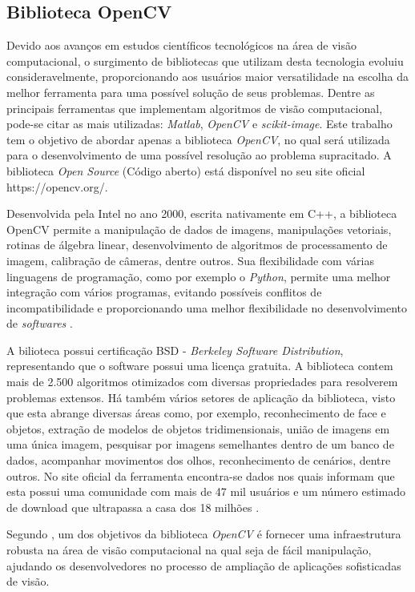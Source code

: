 \subsection{\textbf{Biblioteca OpenCV}}

Devido aos avanços em estudos científicos tecnológicos na área de visão computacional, o surgimento de bibliotecas que utilizam desta tecnologia evoluiu consideravelmente, proporcionando aos usuários maior versatilidade na escolha da melhor ferramenta para uma possível solução de seus problemas. Dentre as principais ferramentas que implementam algoritmos de visão computacional, pode-se citar as mais utilizadas: \textit{Matlab}, \textit{OpenCV} e \textit{scikit-image}. Este trabalho tem o objetivo de abordar apenas a biblioteca \textit{OpenCV}, no qual será utilizada para o desenvolvimento de uma possível resolução ao problema supracitado. A biblioteca \textit{Open Source} (Código aberto) está disponível no seu site oficial https://opencv.org/.

Desenvolvida pela Intel no ano 2000, escrita nativamente em C++, a biblioteca OpenCV permite a manipulação de dados de imagens, manipulações vetoriais, rotinas de álgebra linear, desenvolvimento de algoritmos de processamento de imagem, calibração de câmeras, dentre outros. Sua flexibilidade com várias linguagens de programação, como por exemplo o \textit{Python}, permite uma melhor integração com vários programas, evitando possíveis conflitos de incompatibilidade e proporcionando uma melhor flexibilidade no desenvolvimento de \textit{softwares} \cite{BARBOZA2009}.

A bilioteca possui certificação BSD - \textit{Berkeley Software Distribution}, representando que o software possui uma licença gratuita. A biblioteca contem mais de 2.500 algoritmos otimizados com diversas propriedades para resolverem problemas extensos. Há também vários setores de aplicação da biblioteca, visto que esta abrange diversas áreas como, por exemplo, reconhecimento de face e objetos, extração de modelos de objetos tridimensionais, união de imagens em uma única imagem, pesquisar por imagens semelhantes dentro de um banco de dados, acompanhar movimentos dos olhos, reconhecimento de cenários, dentre outros. No site oficial da ferramenta encontra-se dados nos quais informam que esta possui uma comunidade com mais de 47 mil usuários e um número estimado de download que ultrapassa a casa dos 18 milhões \cite{CUNHA2013}.

Segundo , um dos objetivos da biblioteca \textit{OpenCV} é fornecer uma infraestrutura robusta na área de visão computacional na qual seja de fácil manipulação, ajudando os desenvolvedores no processo de ampliação de aplicações sofisticadas de visão.
